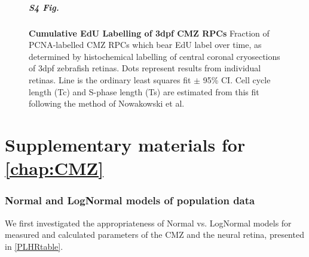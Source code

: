 \documentclass{ut-thesis}
\begin{document}
\begin{NoHyper}
\begin{figure}[h]
\paragraph{S4 Fig.}
\label{cumulativeSupplement}
{\bf Cumulative EdU Labelling of 3dpf CMZ RPCs} Fraction of PCNA-labelled CMZ RPCs which bear EdU label over time, as determined by histochemical labelling of central coronal cryosections of 3dpf zebrafish retinas. Dots represent results from individual retinas. Line is the ordinary least squares fit $\pm$ 95\% CI. Cell cycle length (Tc) and S-phase length (Ts) are estimated from this fit following the method of Nowakowski et al. \cite{Nowakowski1989}
\end{figure}
\chapter{Supplementary materials for \autoref{chap:CMZ}}

\subsection{Normal and LogNormal models of population data}
\label{ssec:NormalModels}

We first investigated the appropriateness of Normal vs. LogNormal models for measured and calculated parameters of the CMZ and the neural retina, presented in \autoref{PLHRtable}.


\end{NoHyper}
\end{document}
